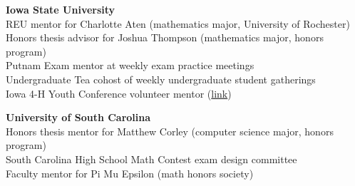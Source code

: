     \noindent \textbf{Iowa State University} \\ %
    REU mentor for Charlotte Aten (mathematics major, University of Rochester)\\
    Honors thesis advisor for Joshua Thompson (mathematics major, honors program)\\
    Putnam Exam mentor at weekly exam practice meetings\\
    Undergraduate Tea cohost of weekly undergraduate student gatherings\\
    Iowa 4-H Youth Conference volunteer mentor
    (\href{https://math.iastate.edu/2015/10/28/4-h-dared-to-discover-the-math-of-juggling/}{link})

    \textbf{University of South Carolina}\\
    Honors thesis mentor for
    Matthew Corley (computer science major, honors program)\\ 
    South Carolina High School Math Contest exam design committee\\
    Faculty mentor for Pi Mu Epsilon (math honors society)
